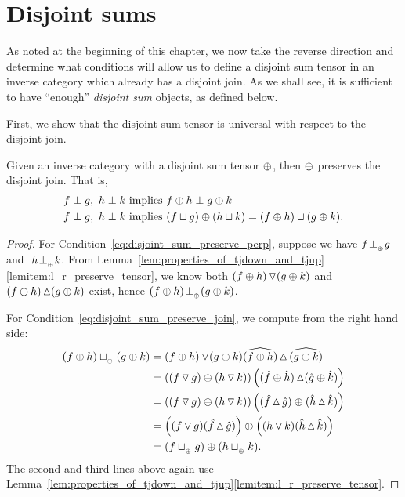\section{Disjoint sums} %
\label{sub:disjoint_sums}

As noted at the beginning of this chapter, we now take the reverse direction and determine what
conditions will allow us to define a disjoint sum tensor in an inverse category which already has a
disjoint join. As we shall see, it is sufficient to have ``enough'' \emph{disjoint sum} objects, as
defined below.

First, we show that the disjoint sum tensor is universal with respect to the disjoint join.

\begin{lemma}\label{lem:disjoint_sum_tensor_preserves_the_disjoint_join}
  Given an inverse category \X with a disjoint sum tensor $\oplus$, then $\oplus$ preserves the disjoint
  join. That is,
  \begin{align}
    f \perp g, \ h \perp k&\text{ implies } f\oplus h \perp g \oplus k
    \label{eq:disjoint_sum_preserve_perp}\\
    f \perp g, \ h \perp k &\text{ implies } (f\sqcup g)\oplus(h\sqcup k) = (f \oplus h )\sqcup (g\oplus k).
    \label{eq:disjoint_sum_preserve_join}
  \end{align}
\end{lemma}
\begin{proof}
  For Condition~\ref{eq:disjoint_sum_preserve_perp}, suppose we have $f {}_{{}_{}}{\perp_{{}_{\oplus}}} g$ and $\ h {}_{{}_{}}{\perp_{{}_{\oplus}}} k$.
  From Lemma~\ref{lem:properties_of_tjdown_and_tjup}\ref{lemitem:l_r_preserve_tensor}, we
  know both $(f\oplus h)\operatorname{\triangledown}(g\oplus k)$ and $(f\oplus h)\operatorname{\vartriangle}(g\oplus k)$ exist, hence $(f\oplus h){}_{{}_{}}{\perp_{{}_{\oplus}}}(g\oplus k)$.

  For Condition~\ref{eq:disjoint_sum_preserve_join}, we compute from the right hand side:
  \begin{align*}
    (f\oplus h)\sqcup_{{_{\oplus}}}(g\oplus k) &= (f\oplus h)\operatorname{\triangledown} (g\oplus k) \widehat{(f\oplus h)}\operatorname{\vartriangle} \widehat{(g\oplus k)}\\
    &= \left( (f\operatorname{\triangledown} g)\oplus (h \operatorname{\triangledown} k) \right)
       \left( (\hat{f}\oplus\hat{h}) \operatorname{\vartriangle} (\hat{g}\oplus\hat{k}) \right) \\
    &= \left( (f\operatorname{\triangledown} g)\oplus (h \operatorname{\triangledown} k) \right)
       \left( (\hat{f}\operatorname{\vartriangle} \hat{g}) \oplus (\hat{h}\operatorname{\vartriangle}\hat{k}) \right) \\
    &= \left( (f\operatorname{\triangledown} g)(\hat{f}\operatorname{\vartriangle} \hat{g})\right) \oplus
       \left((h \operatorname{\triangledown} k) (\hat{h}\operatorname{\vartriangle}\hat{k}) \right) \\
    &=  (f\sqcup_{{_{\oplus}}} g)\oplus(h \sqcup_{{_{\oplus}}} k).
  \end{align*}
  The second and third lines above again use
  Lemma~\ref{lem:properties_of_tjdown_and_tjup}\ref{lemitem:l_r_preserve_tensor}.

\end{proof}

